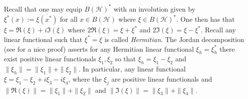 \documentclass{article}
\newcommand{\<}{\langle}
\renewcommand{\>}{\rangle}
\numberwithin{equation}{section}
\theoremstyle{definition}
\begin{document}
Recall that one may equip $B(\mathcal{H})^*$ with an involution given by $\xi^*(x) := \overline{\xi(x^*)}$ for all $x\in B(\mathcal{H})$ where $\xi\in B(\mathcal{H})^*$.  One then has that $\xi = \Re(\xi) + i \Im(\xi)$ where $2 \Re(\xi) = \xi + \xi^*$ and $2\Im(\xi) = \xi - \xi^*$.  Recall any linear functional such that $\xi^* = \xi$ is called \textit{Hermitian}.  The Jordan decomposition \cite[Proposition 3.2.7]{BratteliRobinson_1} (see \cite[Theorem 4.3.6]{KadisonRingrose_1} for a nice proof) asserts for any Hermitian linear functional $\xi_h=\xi_h^*$ there exist positive linear functionals $\xi_1, \xi_2$ so that $\xi_h = \xi_1 - \xi_2$ and $\|\xi_h\| = \|\xi_1\| + \|\xi_2\|$.  In particular, any linear functional $\xi = \xi_1 - \xi_2 +i\xi_3 - i \xi_4$, where the $\xi_j$ are positive linear functionals and $\|\Re(\xi)\| = \|\xi_1\|+ \|\xi_2\|$ and $\|\Im(\xi)\| = \|\xi_3\|+ \|\xi_4\|$.
\end{document}
